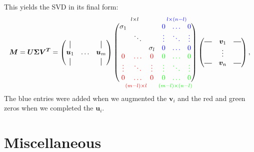     This yields the SVD in its final form:
    \begin{align}
        \bm{M} = \bm{U \Sigma V^T} =
         \begin{pmatrix}
            \vertbar &        & \vertbar \\
            \bm{u}_1 & \hdots & \bm{u}_m \\
            \vertbar &        & \vertbar 
        \end{pmatrix}
        \overset{\quad  l \x l \quad \quad \quad\quad \blue{l \x (n-l)}}{
        \underset{\ \ \ \red{(m-l) \x l} \ \ \quad \green{(m-l) \x (n-l)}}{
        \begin{pmatrix}
                \sigma_1 &        &          & \blue{0      } & \blue{\hdots}  &  \blue{0}  \\
                         & \ddots &          & \blue{\vdots } & \blue{\ddots }  & \blue{\vdots }  \\
                         &        & \sigma_l & \blue{0      } & \blue{\hdots }  & \blue{0      }  \\
                \red{0     }   & \red{\hdots} & \red{0     } & \green{0     }  & \green{\hdots} & \green{0} \\
                \red{\vdots}   & \red{\ddots} & \red{\vdots} & \green{\vdots}  & \green{\ddots} & \green{\vdots}   \\
                \red{0     }   & \red{\hdots} & \red{0     } & \green{0     }  & \green{\hdots} & \green{0}
        \end{pmatrix}}}
        \begin{pmatrix}
            \horzbar & \bm{v}_1     & \horzbar \\
                     & \vdots            &          \\
            \horzbar & \bm{v}_n     & \horzbar \\
        \end{pmatrix},
    \end{align}
    The blue entries were added when we augmented the $\bm{v}_i$ and the red and green zeros when we 
    completed the $\bm{u}_i$.


\section{Miscellaneous}
